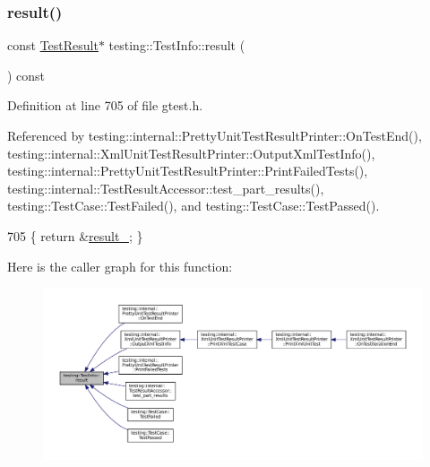 \subsubsection{\texorpdfstring{result()}{result()}}
{\footnotesize\ttfamily const \hyperlink{classtesting_1_1TestResult}{Test\+Result}$\ast$ testing\+::\+Test\+Info\+::result (\begin{DoxyParamCaption}{ }\end{DoxyParamCaption}) const\hspace{0.3cm}{\ttfamily [inline]}}



Definition at line 705 of file gtest.\+h.



Referenced by testing\+::internal\+::\+Pretty\+Unit\+Test\+Result\+Printer\+::\+On\+Test\+End(), testing\+::internal\+::\+Xml\+Unit\+Test\+Result\+Printer\+::\+Output\+Xml\+Test\+Info(), testing\+::internal\+::\+Pretty\+Unit\+Test\+Result\+Printer\+::\+Print\+Failed\+Tests(), testing\+::internal\+::\+Test\+Result\+Accessor\+::test\+\_\+part\+\_\+results(), testing\+::\+Test\+Case\+::\+Test\+Failed(), and testing\+::\+Test\+Case\+::\+Test\+Passed().


\begin{DoxyCode}
705 \{ \textcolor{keywordflow}{return} &\hyperlink{classtesting_1_1TestInfo_a108fd469897a8d4e5c4361947a5ed785}{result\_}; \}
\end{DoxyCode}
Here is the caller graph for this function\+:
\nopagebreak
\begin{figure}[H]
\begin{center}
\leavevmode
\includegraphics[width=350pt]{classtesting_1_1TestInfo_aee8cb884c95cd446129aba936b4159e0_icgraph}
\end{center}
\end{figure}
\mbox{\label{classtesting_1_1TestInfo_ade784915e9be3a01e3a6ef509b77d6c9}} 
